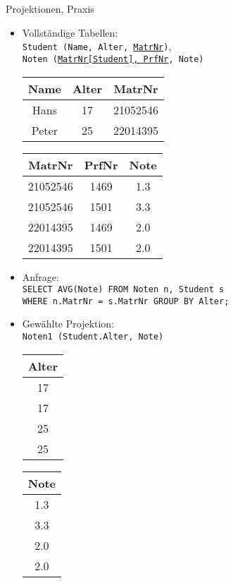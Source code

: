 \begin{frame}{Projektionen, Praxis}
\begin{itemize}[<+->]
\item Vollst\"andige Tabellen: \\
  {\small
  \texttt{Student (Name, Alter, \underline{MatrNr})},\\
  \texttt{Noten (\underline{MatrNr[Student], PrfNr}, Note)}
  } \\
  \begin{tabular}{ | c | c | c | }
  	\hline
  	Name  & Alter & MatrNr   \\ \hline
  	Hans  & 17    & 21052546 \\ \hline
  	Peter & 25    & 22014395 \\ \hline
  \end{tabular} 
  \quad
  \begin{tabular}{ | c | c | c |}
  	\hline
  	MatrNr   & PrfNr & Note \\ \hline
  	21052546 & 1469  & 1.3  \\ \hline
  	21052546 & 1501  & 3.3  \\ \hline
  	22014395 & 1469  & 2.0  \\ \hline
  	22014395 & 1501  & 2.0  \\ \hline
  \end{tabular}
  \vspace{2mm}
\item Anfrage: \\
  {\small
  \texttt{SELECT AVG(Note) FROM Noten n, Student s \\
  WHERE n.MatrNr = s.MatrNr GROUP BY Alter;}
  }
\item Gew\"ahlte Projektion: \\
\texttt{Noten1 (Student.Alter, Note)}
\quad
\begin{tabular}{|c|}
	\hline
	Alter \\ \hline
	 17   \\ \hline
	 17   \\ \hline
	 25   \\ \hline
	 25   \\ \hline
\end{tabular}
\quad
\begin{tabular}{|c|}
	\hline
	Note \\ \hline
	1.3  \\ \hline
	3.3  \\ \hline
	2.0  \\ \hline
	2.0  \\ \hline
\end{tabular}
\end{itemize}
\end{frame}

